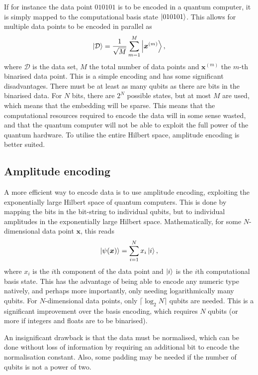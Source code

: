 If for instance the data point $010101$ is to be encoded in a quantum computer, it is simply mapped to the computational basis state $\ket{010101}$. This allows for multiple data points to be encoded in parallel as
\begin{equation}
    \ket{\mathcal{D}} = \frac{1}{\sqrt M} \sum_{m=1}^M \ket{\bm{x}^{(m)}},
\end{equation}
where $\mathcal{D}$ is the data set, $M$ the total number of data points and $\bm{x}^{(m)}$ the $m$-th binarised data point. This is a simple encoding and has some significant disadvantages. There must be at least as many qubits as there are bits in the binarised data. For $N$ bits, there are $2^N$ possible states, but at most $M$ are used, which means that the embedding will be sparse. This means that the computational resources required to encode the data will in some sense wasted, and that the quantum computer will not be able to exploit the full power of the quantum hardware. To utilise the entire Hilbert space, amplitude encoding is better suited.

\subsection{Amplitude encoding}
A more efficient way to encode data is to use amplitude encoding, exploiting the exponentially large Hilbert space of quantum computers. This is done by mapping the bits in the bit-string to individual qubits, but to individual amplitudes in the exponentially large Hilbert space. Mathematically, for some $N$-dimensional data point $\bm{x}$, this reads
\begin{equation}
    \ket{\psi(\bm{x})} = \sum_{i=1}^{N} x_i \ket{i},
\end{equation}
where $x_i$ is the $i$th component of the data point and $\ket{i}$ is the $i$th computational basis state. This has the advantage of being able to encode any numeric type natively, and perhaps more importantly, only needing logarithmically many qubits. For $N$-dimensional data points, only $\lceil \log_2 N \rceil$ qubits are needed. This is a significant improvement over the basis encoding, which requires $N$ qubits (or more if integers and floats are to be binarised).

An insignificant drawback is that the data must be normalised, which can be done without loss of information by requiring an additional bit to encode the normalisation constant. Also, some padding may be needed if the number of qubits is not a power of two.

